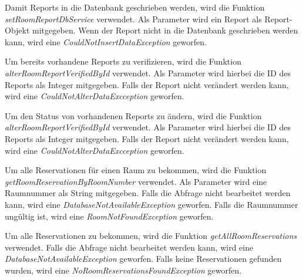 

Damit Reports in die Datenbank geschrieben werden, wird die Funktion \emph{setRoomReportDbService} verwendet. Als Parameter wird ein Report als Report-Objekt mitgegeben. Wenn der Report nicht in die Datenbank geschrieben werden kann, wird eine \emph{CouldNotInsertDataException} geworfen.



Um bereits vorhandene Reports zu verifizieren, wird die Funktion \emph{alterRoomReportVerifiedById} verwendet. Als Parameter wird hierbei die ID des Reports als Integer mitgegeben. Falls der Report nicht verändert werden kann, wird eine \emph{CouldNotAlterDataExcception} geworfen.


Um den Status von vorhandenen Reports zu ändern, wird die Funktion \emph{alterRoomReportVerifiedById} verwendet. Als Parameter wird hierbei die ID des Reports als Integer mitgegeben. Falls der Report nicht verändert werden kann, wird eine \emph{CouldNotAlterDataExcception} geworfen.


Um alle Reservationen für einen Raum zu bekommen, wird die Funktion \emph{getRoomReservationByRoomNumber} verwendet. Als Parameter wird eine Raumnummer als String mitgegeben. Falls die Abfrage nicht bearbeitet werden kann, wird eine \emph{DatabaseNotAvailableException} geworfen. Falls die Raumnummer ungültig ist, wird eine \emph{RoomNotFoundException} geworfen.


Um alle Reservationen zu bekommen, wird die Funktion \emph{getAllRoomReservations} verwendet. Falls die Abfrage nicht bearbeitet werden kann, wird eine \emph{DatabaseNotAvailableException} geworfen. Falls keine Reservationen gefunden wurden, wird eine \emph{NoRoomReservationsFoundException} geworfen.

